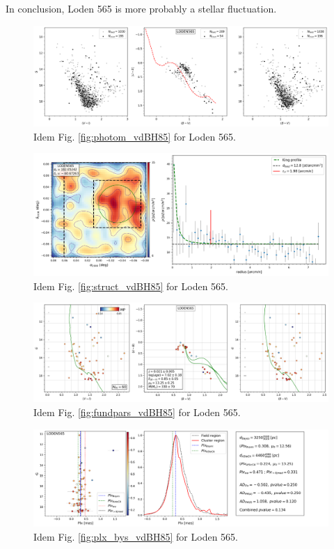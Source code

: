 \documentclass[referee]{aa}
\begin{document}
In conclusion, Loden 565 is more probably a stellar fluctuation.

\begin{figure}[ht]
    \centering
    \includegraphics[width=\hsize]{../figs/obs_LODEN565.png}
    \caption{Idem Fig. \ref{fig:photom_vdBH85} for Loden 565.}
    \label{fig55}
\end{figure}
\begin{figure}[ht]
    \centering
    \includegraphics[width=\hsize]{../figs/dmap_loden565.png}
    \caption{Idem Fig. \ref{fig:struct_vdBH85} for Loden 565.}
    \label{fig56}
\end{figure}
\begin{figure}[ht]
    \centering
    \includegraphics[width=\hsize]{../figs/cmds_loden565.png}
    \caption{Idem Fig. \ref{fig:fundpars_vdBH85} for Loden 565.}
    \label{fig57}
\end{figure}
\begin{figure}[ht]
    \centering
    \includegraphics[width=\hsize]{../figs/plx_LODEN565.png}
    \caption{Idem Fig. \ref{fig:plx_bys_vdBH85} for Loden 565.}
    \label{fig58}
\end{figure}
\end{document}
